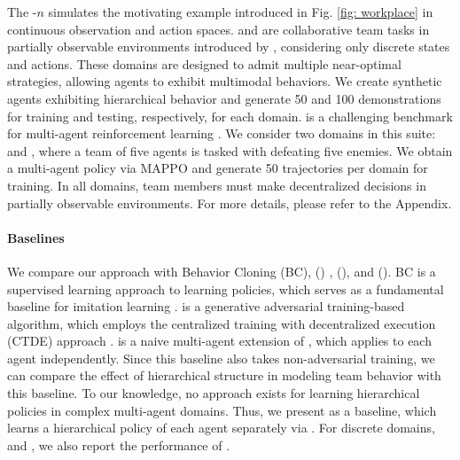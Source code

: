 The \simplemulti-$n$ simulates the motivating example introduced in Fig. \ref{fig: workplace} in continuous observation and action spaces. \movers and \rescue are collaborative team tasks in partially observable environments introduced by \cite{seo2023automated}, considering only discrete states and actions. These domains are designed to admit multiple near-optimal strategies, allowing agents to exhibit multimodal behaviors. We create synthetic agents exhibiting hierarchical behavior and generate 50 and 100 demonstrations for training and testing, respectively, for each domain. \smactwo is a challenging benchmark for multi-agent reinforcement learning \cite{ellis2023smacv2}. We consider two domains in this suite: \protoss and \terran, where a team of five agents is tasked with defeating five enemies. We obtain a multi-agent policy via MAPPO \cite{yu2022the} and generate 50 trajectories per domain for training. In all domains, team members must make decentralized decisions in partially observable environments. For more details, please refer to the Appendix.



\paragraph{Baselines} 
We compare our approach with Behavior Cloning (BC), \magail (\magailsh) \cite{song2018multi}, \iiql (\iiqlsh), and \maogail (\maogailsh).  BC is a supervised learning approach to learning policies, which serves as a fundamental baseline for imitation learning \cite{li2022rethinking}. \magail is a generative adversarial training-based \mail algorithm, which employs the centralized training with decentralized execution (CTDE) approach
\cite{goodfellow2014generative}.
\iiql is a naive multi-agent extension of \iql \cite{garg2021iq}, which applies \iql to each agent independently. Since this baseline also takes non-adversarial training, we can compare the effect of hierarchical structure in modeling team behavior with this baseline. 
To our knowledge, no approach exists for learning hierarchical policies in complex multi-agent domains. Thus, we present \maogail as a baseline, which learns a hierarchical policy of each agent separately via \ogail \cite{jing2021adversarial}. For discrete domains, \movers and \rescue, we also report the performance of \btil \cite{seo2022semi}.



